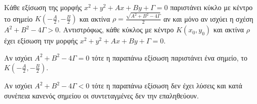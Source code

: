 \documentclass[twoside,nofonts,internet,shmeiwseis]{thewria}
\begin{document}
\thewrhmata
{}
Κάθε εξίσωση της μορφής $ x^2+y^2+Ax+By+\varGamma=0 $ παριστάνει κύκλο με κέντρο το σημείο $ K\left(-\frac{A}{2},-\frac{B}{2} \right) $ και ακτίνα $ \rho=\frac{\sqrt{A^2+B^2-4\varGamma}}{2} $ αν και μόνο αν ισχύει η σχέση $ A^2+B^2-4\varGamma>0 $. Αντιστρόφως, κάθε κύκλος με κέντρο $ K(x_0,y_0) $ και ακτίνα $ \rho $ έχει εξίσωση την μορφής $ x^2+y^2+Ax+By+\varGamma=0 $.
\begin{rlist}
\item Αν ισχύει $ A^2+B^2-4\varGamma=0 $ τότε η παραπάνω εξίσωση παριστάνει ένα σημείο, το $ K\left(-\frac{A}{2},-\frac{B}{2} \right) $.
\item Αν ισχύει $ A^2+B^2-4\varGamma<0 $ τότε η παραπάνω εξίσωση δεν έχει λύσεις και κατά συνέπεια κανενός σημείου οι συντεταγμένες δεν την επαληθεύουν.
\end{rlist}
\end{document}
